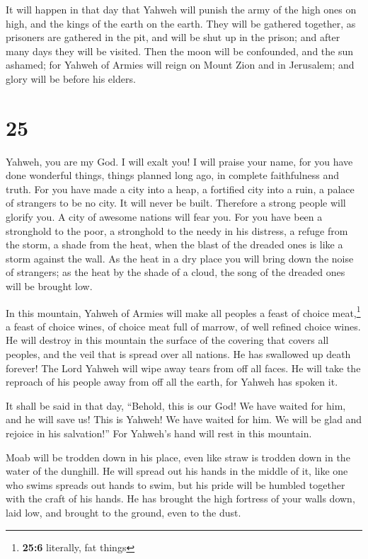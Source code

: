  It will happen in that day that Yahweh will punish the
army of the high ones on high, and the kings of the earth on the earth.
 They will be gathered together, as prisoners are
gathered in the pit, and will be shut up in the prison; and after many
days they will be visited.  Then the moon will be
confounded, and the sun ashamed; for Yahweh of Armies will reign on
Mount Zion and in Jerusalem; and glory will be before his elders.

\hypertarget{section-24}{%
\section{25}\label{section-24}}

 Yahweh, you are my God. I will exalt you! I will praise
your name, for you have done wonderful things, things planned long ago,
in complete faithfulness and truth.  For you have made a
city into a heap, a fortified city into a ruin, a palace of strangers to
be no city. It will never be built.  Therefore a strong
people will glorify you. A city of awesome nations will fear you.
 For you have been a stronghold to the poor, a stronghold
to the needy in his distress, a refuge from the storm, a shade from the
heat, when the blast of the dreaded ones is like a storm against the
wall.  As the heat in a dry place you will bring down the
noise of strangers; as the heat by the shade of a cloud, the song of the
dreaded ones will be brought low.

 In this mountain, Yahweh of Armies will make all peoples
a feast of choice meat,\footnote{\textbf{25:6} literally, fat things} a
feast of choice wines, of choice meat full of marrow, of well refined
choice wines.  He will destroy in this mountain the
surface of the covering that covers all peoples, and the veil that is
spread over all nations.  He has swallowed up death
forever! The Lord Yahweh will wipe away tears from off all faces. He
will take the reproach of his people away from off all the earth, for
Yahweh has spoken it.

 It shall be said in that day, ``Behold, this is our God!
We have waited for him, and he will save us! This is Yahweh! We have
waited for him. We will be glad and rejoice in his salvation!''
 For Yahweh's hand will rest in this mountain.

Moab will be trodden down in his place, even like straw is trodden down
in the water of the dunghill.  He will spread out his
hands in the middle of it, like one who swims spreads out hands to swim,
but his pride will be humbled together with the craft of his hands.
 He has brought the high fortress of your walls down,
laid low, and brought to the ground, even to the dust.

